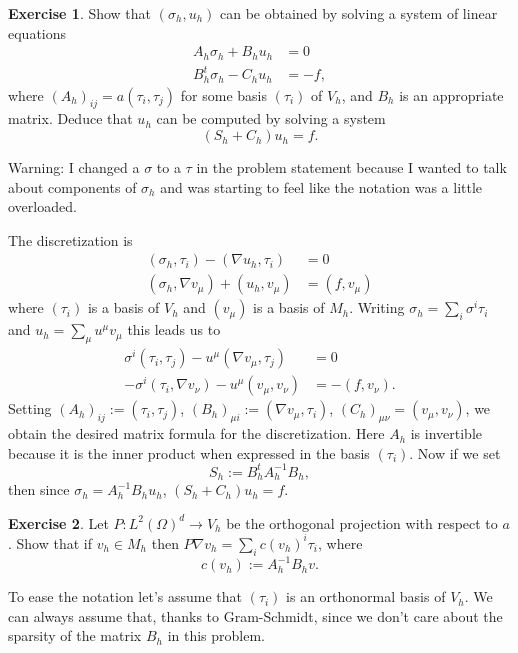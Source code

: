 \documentclass[10pt]{article}
\theoremstyle{definition}
\newtheorem{exer}{Exercise}
\begin{document}
\begin{exer}
    Show that $(\sigma_h, u_h)$ can be obtained by solving a system of linear equations 
    \begin{align*}
        A_h \sigma_h + B_h u_h &= 0 \\
        B_h^t \sigma_h - C_h u_h &= -f,
    \end{align*}
    where $(A_h)_{ij} = a(\tau_i, \tau_j)$ for some basis $(\tau_i)$ of $V_h$, and $B_h$ is an appropriate matrix.
    Deduce that $u_h$ can be computed by solving a system
    $$(S_h + C_h) u_h = f.$$
\end{exer}

Warning: I changed a $\sigma$ to a $\tau$ in the problem statement because I wanted to talk about components of $\sigma_h$ and was starting to feel like the notation was a little overloaded.

The discretization is 
\begin{align*}
    (\sigma_h, \tau_i) - (\nabla u_h, \tau_i) &= 0 \\
    (\sigma_h, \nabla v_\mu) + (u_h, v_\mu) &= (f, v_\mu)
\end{align*}
where $(\tau_i)$ is a basis of $V_h$ and $(v_\mu)$ is a basis of $M_h$.
Writing $\sigma_h = \sum_i \sigma^i \tau_i$ and $u_h = \sum_\mu u^\mu v_\mu$ this leads us to
\begin{align*}
    \sigma^i (\tau_i, \tau_j) - u^\mu (\nabla v_\mu, \tau_j) &= 0\\
    -\sigma^i (\tau_i, \nabla v_\nu) - u^\mu (v_\mu, v_\nu) &= -(f, v_\nu).
\end{align*}
Setting $(A_h)_{ij} := (\tau_i, \tau_j)$, $(B_h)_{\mu i} := (\nabla v_\mu, \tau_i)$, $(C_h)_{\mu \nu} = (v_\mu, v_\nu)$, we obtain the desired matrix formula for the discretization.
Here $A_h$ is invertible because it is the inner product when expressed in the basis $(\tau_i)$.
Now if we set 
$$S_h := B_h^t A_h^{-1} B_h,$$
then since $\sigma_h = A_h^{-1} B_h u_h$, $(S_h + C_h) u_h = f$.

\begin{exer}
    Let $P: L^2(\Omega)^d \to V_h$ be the orthogonal projection with respect to $a$.
    Show that if $v_h \in M_h$ then $P \nabla v_h = \sum_i c(v_h)^i \tau_i$, where 
    $$c(v_h) := A_h^{-1} B_h v.$$
\end{exer}

To ease the notation let's assume that $(\tau_i)$ is an orthonormal basis of $V_h$.
We can always assume that, thanks to Gram-Schmidt, since we don't care about the sparsity of the matrix $B_h$ in this problem.
\end{document}

